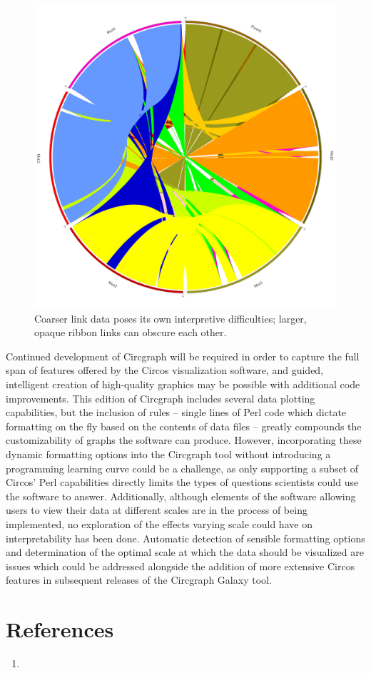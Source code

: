 \documentclass{article}
\begin{document}
\begin{figure}
\centering
\includegraphics[scale=0.1]{./Generated_Color_Fixes.png}
\caption{Coarser link data poses its own interpretive difficulties; larger, opaque ribbon links can obscure each other.}
\end{figure}

Continued development of Circgraph will be required in order to capture the full span of features offered by the Circos visualization software, and guided, intelligent creation of high-quality graphics may be possible with additional code improvements. This edition of Circgraph includes several data plotting capabilities, but the inclusion of rules -- single lines of Perl code which dictate formatting on the fly based on the contents of data files -- greatly compounds the customizability of graphs the software can produce. However, incorporating these dynamic formatting options into the Circgraph tool without introducing a programming learning curve could be a challenge, as only supporting a subset of Circos' Perl capabilities directly limits the types of questions scientists could use the software to answer. Additionally, although elements of the software allowing users to view their data at different scales are in the process of being implemented, no exploration of the effects varying scale could have on interpretability has been done. Automatic detection of sensible formatting options and determination of the optimal scale at which the data should be visualized are issues which could be addressed alongside the addition of more extensive Circos features in subsequent releases of the Circgraph Galaxy tool.

\section*{References}
\begin{enumerate}
\item
\end{enumerate}
\end{document}
